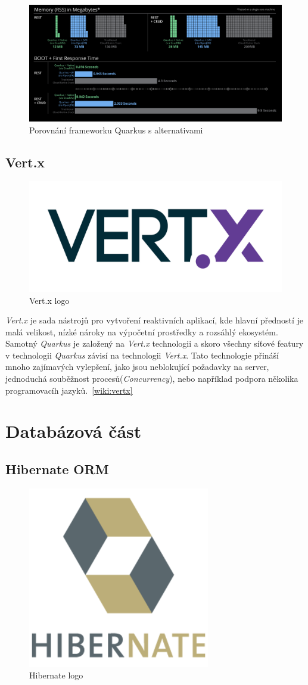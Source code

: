 \begin{figure}[hbt]
  \centering
  \includegraphics[width=1 \linewidth]{obrazky-figures/quarkus_stats.png}
  \caption{Porovnání frameworku Quarkus s alternativami}
  \label{figure:quarkus_stats}
\end{figure}

\newpage
\subsection*{Vert.x}
\label{pouzite:vertx}
\begin{figure}[hbt]
  \centering
  \includegraphics[width=.30 \linewidth]{obrazky-figures/vertx.png}
  \caption{Vert.x logo}
\end{figure}

\emph{Vert.x} je sada nástrojů pro vytvoření reaktivních aplikací, kde hlavní předností je malá velikost, nízké nároky na výpočetní prostředky a rozsáhlý ekosystém.
Samotný \emph{Quarkus} je založený na \emph{Vert.x} technologii a skoro všechny síťové featury v technologii \emph{Quarkus} závisí na technologii \emph{Vert.x}.
Tato technologie přináší mnoho zajímavých vylepšení, jako jsou neblokující požadavky na server, jednoduchá souběžnost procesů(\emph{Concurrency}), nebo například podpora několika programovacíh jazyků.~\ref{wiki:vertx}

\section{Databázová část}
\label{pouzite:db}

\subsection*{Hibernate ORM}
\label{app_prostredi:hibernate}
\begin{figure}[hbt]
  \centering
  \includegraphics[width=.2 \linewidth]{obrazky-figures/hibernate.png}
  \caption{Hibernate logo}
\end{figure}


